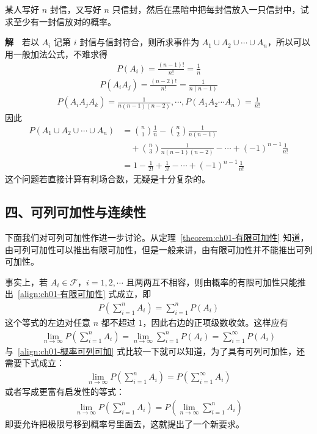 \documentclass[../../main.tex]{subfiles}
\begin{document}
\begin{example}[匹配问题]\label{example:ch01-匹配问题}
某人写好 $n$ 封信，又写好 $n$ 只信封，然后在黑暗中把每封信放入一只信封中，试求至少有一封信放对的概率。

\textbf{解}~~若以 $A_i$ 记第 $i$ 封信与信封符合，则所求事件为 $A_1\cup A_2\cup\cdots\cup A_n$，所以可以用一般加法公式，不难求得
\begin{align*}
P(A_i)=\frac{(n-1)!}{n!}=\frac{1}{n}
\end{align*}
\begin{align*}
P(A_iA_j)=\frac{(n-2)!}{n!}=\frac{1}{n(n-1)}
\end{align*}
\begin{align*}
P(A_iA_jA_k)=\frac{1}{n(n-1)(n-2)},\cdots,P(A_1A_2\cdots A_n)=\frac{1}{n!}
\end{align*}
因此
\begin{align*}
P(A_1\cup A_2\cup\cdots\cup A_n)&=\binom{n}{1}\frac{1}{n}-\binom{n}{2}\frac{1}{n(n-1)}\\
&\quad+\binom{n}{3}\frac{1}{n(n-1)(n-2)}-\cdots+(-1)^{n-1}\frac{1}{n!}\\
&=1-\frac{1}{2!}+\frac{1}{3!}-\cdots+(-1)^{n-1}\frac{1}{n!}
\end{align*}
这个问题若直接计算有利场合数，无疑是十分复杂的。
\end{example}

\subsection*{四、可列可加性与连续性}

下面我们对可列可加性作进一步讨论。从定理~\ref{theorem:ch01-有限可加性} 知道，由可列可加性可以推出有限可加性，但是一般来讲，由有限可加性并不能推出可列可加性。

事实上，若 $A_i\in\mathscr{F}$，$i=1,2,\cdots$ 且两两互不相容，则由概率的有限可加性只能推出~\eqref{align:ch01-有限可加性} 式成立，即
\begin{align}
P\left(\sum_{i=1}^{n}A_i\right)=\sum_{i=1}^{n}P(A_i)\label{align:ch01-有限和}
\end{align}
这个等式的左边对任意 $n$ 都不超过 $1$，因此右边的正项级数收敛。这样应有
\begin{align}
\lim_{n\to\infty}P\left(\sum_{i=1}^{n}A_i\right)=\lim_{n\to\infty}\sum_{i=1}^{n}P(A_i)=\sum_{i=1}^{\infty}P(A_i)\label{align:ch01-级数收敛}
\end{align}
与~\eqref{align:ch01-概率可列可加} 式比较一下就可以知道，为了具有可列可加性，还需要下式成立：
\begin{align}
\lim_{n\to\infty}P\left(\sum_{i=1}^{n}A_i\right)=P\left(\sum_{i=1}^{\infty}A_i\right)\label{align:ch01-交换极限}
\end{align}
或者写成更富有启发性的等式：
\begin{align}
\lim_{n\to\infty}P\left(\sum_{i=1}^{n}A_i\right)=P\left(\lim_{n\to\infty}\sum_{i=1}^{n}A_i\right)\label{align:ch01-交换极限启发性}
\end{align}
即要允许把极限号移到概率号里面去，这就提出了一个新要求。
\end{document}
